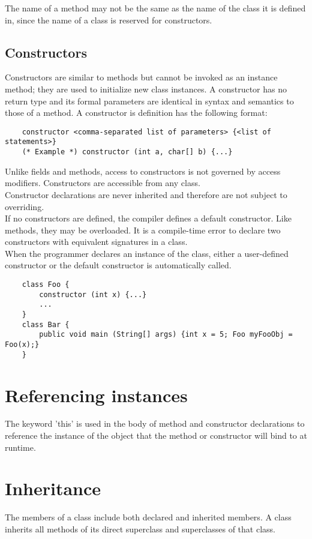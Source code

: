 \begin{homeworkProblem}
	The name of a method may not be the same as the name of the class it is defined in, since the name of a class is reserved for constructors.
	
	\subsection{Constructors}
	Constructors are similar to methods but cannot be invoked as an instance method; they are used to initialize new class instances. A constructor has no return type and its formal parameters are identical in syntax and semantics to those of a method. A constructor is definition has the following format:
	\begin{verbatim}
	constructor <comma-separated list of parameters> {<list of statements>}
	(* Example *) constructor (int a, char[] b) {...}
	\end{verbatim}

	Unlike fields and methods, access to constructors is not governed by access modifiers. Constructors are accessible from any class.\\
	
	Constructor declarations are never inherited and therefore are not subject to overriding.\\
	
	If no constructors are defined, the compiler defines a default constructor. Like methods, they may be overloaded. It is a compile-time error to declare two constructors with equivalent signatures in a class.\\
	
	When the programmer declares an instance of the class, either a user-defined constructor or the default constructor is automatically called.
	\begin{verbatim}
	class Foo {
		constructor (int x) {...}
		...
	}
	class Bar {
		public void main (String[] args) {int x = 5; Foo myFooObj = Foo(x);}
	}
	\end{verbatim}
	
	\section{Referencing instances}
	The keyword 'this' is used in the body of method and constructor declarations to reference the instance of the object that the method or constructor will bind to at runtime.
	
	\section{Inheritance}
	The members of a class include both declared and inherited members. A class inherits all methods of its direct superclass and superclasses of that class.
	

\end{homeworkProblem}
